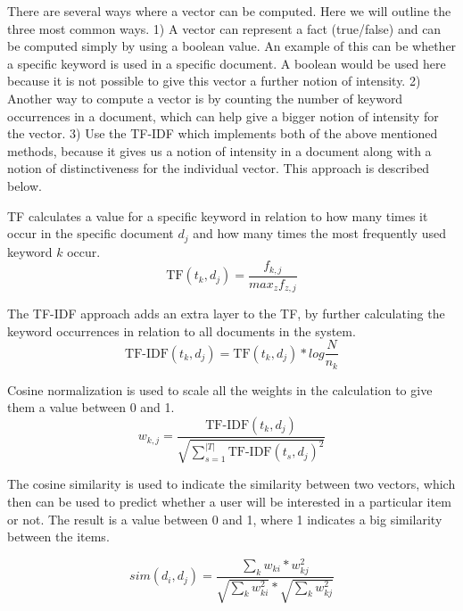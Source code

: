 There are several ways where a vector can be computed. Here we will outline the three most common ways. 1) A vector can represent a fact (true/false) and can be computed simply by using a boolean value. An example of this can be whether a specific keyword is used in a specific document. A boolean would be used here because it is not possible to give this vector a further notion of intensity. 2) Another way to compute a vector is by counting the number of keyword occurrences in a document, which can help give a bigger notion of intensity for the vector. 3) Use the TF-IDF which implements both of the above mentioned methods, because it gives us a notion of intensity in a document along with a notion of distinctiveness for the individual vector. This approach is described below.\newline

TF calculates a value for a specific keyword in relation to how many times it occur in the specific document \(d_{j}\) and how many times the most frequently used keyword \(k\) occur.
\[
	\text{TF}(t_{k},d_{j}) = \frac{f_{k,j}}{max_{z}f_{z,j}}
\]

The TF-IDF approach adds an extra layer to the TF, by further calculating the keyword occurrences in relation to all documents in the system.
\[
	\text{TF-IDF}(t_{k},d_{j}) = \text{TF}(t_{k},d_{j}) * log{\frac{N}{n_{k}}}
\]

Cosine normalization is used to scale all the weights in the calculation to give them a value between 0 and 1.
\[
	w_{k,j} = \frac{\text{TF-IDF}(t_{k},d_{j})}{\sqrt{\sum_{s=1}^{|T|} \text{TF-IDF}(t_{s}, d_{j})^2}}
\]

The cosine similarity is used to indicate the similarity between two vectors, which then can be used to predict whether a user will be interested in a particular item or not. The result is a value between 0 and 1, where 1 indicates a big similarity between the items.

\[
	sim({d_{i},d_{j}}) = \frac{\sum_{k}w_{ki}*w_{kj}^2}{\sqrt{\sum_{k}w_{ki}^2}*\sqrt{\sum_{k}w_{kj}^2}}
\]


